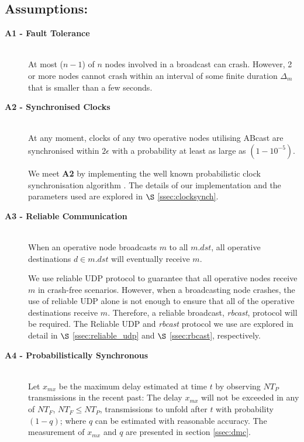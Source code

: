     \subsection*{Assumptions:}  
    \begin{description} 
        \item [\textbf{A1 - Fault Tolerance}] \hfill \\
        At most ($n-1$) of $n$ nodes involved in a broadcast can crash. However, 2 or more nodes cannot crash within an interval of some finite duration $\Delta_m$ that is smaller than a few seconds.
        
        \item [\textbf{A2 - Synchronised Clocks}] \hfill \\
        At any moment, clocks of any two operative nodes utilising \textsf{ABcast} are synchronised within $2\epsilon$ with a probability at least as large as $(1-10^{-5})$.
        
        We meet \textbf{A2} by implementing the well known probabilistic clock synchronisation algorithm \citep{Cristian:1996:SA:227210.227231}.  The details of our implementation and the parameters used are explored in $\S$ \ref{ssec:clocksynch}.       
        
        \item [\textbf{A3 - Reliable Communication}] \hfill \\
        When an operative node broadcasts $m$ to all $m.dst$, all operative destinations $d \in m.dst$ will eventually receive $m$.  
        
        We use reliable UDP protocol to guarantee that all operative nodes receive $m$ in crash-free scenarios.  However, when a broadcasting node crashes, the use of reliable UDP alone is not enough to ensure that all of the operative destinations receive $m$.  Therefore, a reliable broadcast, \emph{rbcast}, protocol will be required.  The Reliable UDP and \emph{rbcast} protocol we use are explored in detail in $\S$ \ref{ssec:reliable_udp} and $\S$ \ref{ssec:rbcast}, respectively.  
        
        \item [\textbf{A4 - Probabilistically Synchronous}] \hfill \\
        Let $x_{mx}$ be the maximum delay estimated at time $t$ by observing $NT_P$ transmissions in the recent past: The delay $x_{mx}$ will not be exceeded in any of $NT_F$, $NT_F \leq NT_P$, transmissions to unfold after $t$ with probability $(1 - q)$; where $q$ can be estimated with reasonable accuracy.  The measurement of $x_{mx}$ and $q$ are presented in section \ref{ssec:dmc}.  
        

\end{description}
